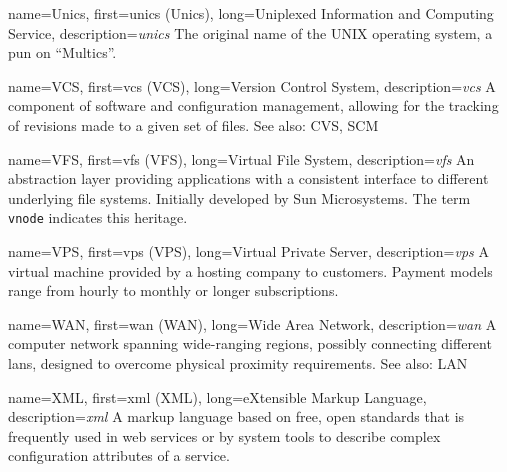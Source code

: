 {
	name={Unics},
	first={\acrlong{unics} (Unics)},
	long={Uniplexed Information and Computing Service},
	description={{\em \acrlong{unics}} The
original name of the UNIX operating system, a pun on
``Multics''.}
}

{
	name={VCS},
	first={\acrlong{vcs} (VCS)},
	long={Version Control System},
	description={{\em \acrlong{vcs}} A
component of software and configuration management,
allowing for the tracking of revisions made to a given
set of files.  See also: CVS, SCM}
}

{
	name={VFS},
	first={\acrlong{vfs} (VFS)},
	long={Virtual File System},
	description={{\em \acrlong{vfs}} An abstraction layer providing
applications with a consistent interface to different underlying
file systems.  Initially developed by Sun Microsystems.  The term {\tt
vnode} indicates this heritage.}
}

{
	name={VPS},
	first={\acrlong{vps} (VPS)},
	long={Virtual Private Server},
	description={{\em \acrlong{vps}} A virtual machine provided by a
hosting company to customers.  Payment models range from hourly to monthly
or longer subscriptions.}
}

{
	name={WAN},
	first={\acrlong{wan} (WAN)},
	long={Wide Area Network},
	description={{\em \acrlong{wan}} A computer
network spanning wide-ranging regions, possibly
connecting different \acrlong{lan}s, designed to
overcome physical proximity requirements. See also: LAN}
}

{
	name={XML},
	first={\acrlong{xml} (XML)},
	long={eXtensible Markup Language},
	description={{\em \acrlong{xml}} A markup
language based on free, open standards that is frequently
used in web services or by system tools to
describe complex configuration attributes of a
service.}
}
